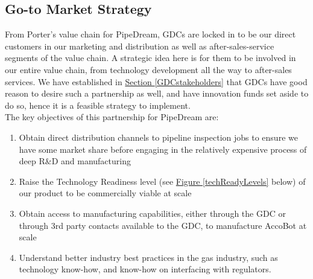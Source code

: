 \documentclass[11pt]{article}		%
\newcommand{\figref}[1]{\hyperref[#1]{Figure \ref*{#1}}}    %
\newcommand{\sectref}[1]{\hyperref[#1]{Section \ref*{#1}}}     %
\begin{document}
	\subsection{Go-to Market Strategy}
	From Porter’s value chain for PipeDream, GDCs are locked in to be our direct customers in our marketing and distribution as well as after-sales-service segments of the value chain. A strategic idea here is for them to be involved in our entire value chain, from technology development all the way to after-sales services. We have established in \sectref{GDCstakeholders} that GDCs have good reason to desire such a partnership as well, and have innovation funds set aside to do so, hence it is a feasible strategy to implement.
	\\The key objectives of this partnership for PipeDream are:
    \begin{enumerate}
    \item Obtain direct distribution channels to pipeline inspection jobs to ensure we have some market share before engaging in the relatively expensive process of deep R\&D and manufacturing
    \item Raise the Technology Readiness level (see \figref{techReadyLevels} below) of our product to be commercially viable at scale 
    \item Obtain access to manufacturing capabilities, either through the GDC or through 3rd party contacts available to the GDC, to manufacture AccoBot at scale
    \item Understand better industry best practices in the gas industry, such as technology know-how, and know-how on interfacing with regulators. 
    \end{enumerate}
\end{document}
